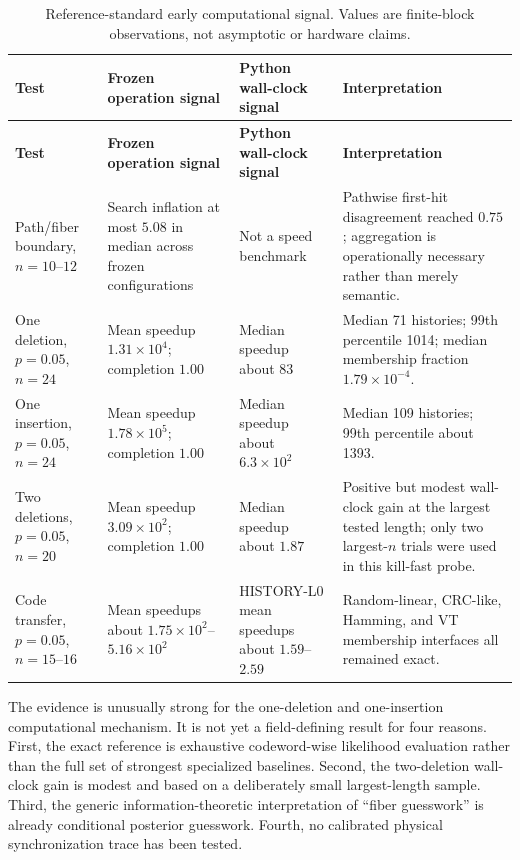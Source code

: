 \documentclass[11pt]{article}
\begin{document}
\begin{longtable}{@{}p{}p{}p{}p{}@{}}
\caption{Reference-standard early computational signal. Values are finite-block observations, not asymptotic or hardware claims.}\label{tab:validation}\\
\toprule
\textbf{Test} & \textbf{Frozen operation signal} & \textbf{Python wall-clock signal} & \textbf{Interpretation}\\
\midrule
\endfirsthead
\toprule
\textbf{Test} & \textbf{Frozen operation signal} & \textbf{Python wall-clock signal} & \textbf{Interpretation}\\
\midrule
\endhead
Path/fiber boundary, $n=10$--$12$ & Search inflation at most $5.08$ in median across frozen configurations & Not a speed benchmark & Pathwise first-hit disagreement reached $0.75$; aggregation is operationally necessary rather than merely semantic.\\
One deletion, $p=0.05$, $n=24$ & Mean speedup $1.31\times10^4$; completion $1.00$ & Median speedup about $83$ & Median 71 histories; 99th percentile 1014; median membership fraction $1.79\times10^{-4}$.\\
One insertion, $p=0.05$, $n=24$ & Mean speedup $1.78\times10^5$; completion $1.00$ & Median speedup about $6.3\times10^2$ & Median 109 histories; 99th percentile about 1393.\\
Two deletions, $p=0.05$, $n=20$ & Mean speedup $3.09\times10^2$; completion $1.00$ & Median speedup about $1.87$ & Positive but modest wall-clock gain at the largest tested length; only two largest-$n$ trials were used in this kill-fast probe.\\
Code transfer, $p=0.05$, $n=15$--$16$ & Mean speedups about $1.75\times10^2$--$5.16\times10^2$ & HISTORY-L0 mean speedups about $1.59$--$2.59$ & Random-linear, CRC-like, Hamming, and VT membership interfaces all remained exact.\\
\bottomrule
\end{longtable}

The evidence is unusually strong for the one-deletion and one-insertion computational mechanism. It is not yet a field-defining result for four reasons. First, the exact reference is exhaustive codeword-wise likelihood evaluation rather than the full set of strongest specialized baselines. Second, the two-deletion wall-clock gain is modest and based on a deliberately small largest-length sample. Third, the generic information-theoretic interpretation of ``fiber guesswork'' is already conditional posterior guesswork. Fourth, no calibrated physical synchronization trace has been tested.
\end{document}

